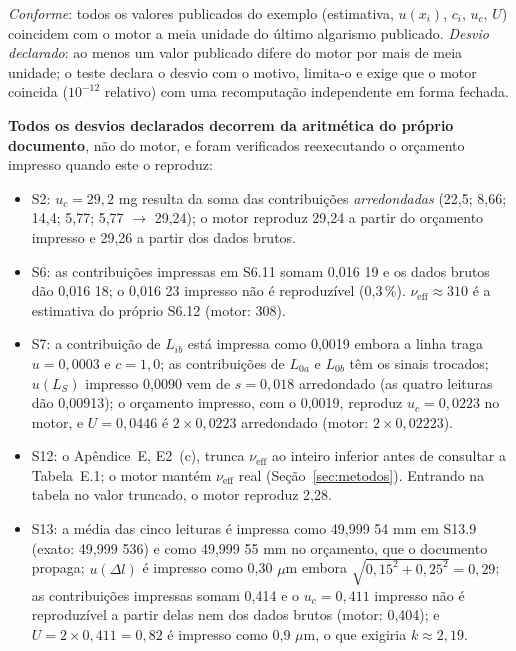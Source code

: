 \documentclass[11pt,a4paper]{article}
\begin{document}
{\small \emph{Conforme}: todos os valores publicados do exemplo (estimativa, \(u(x_i)\), \(c_i\), \(u_c\), \(U\)) coincidem com o motor a meia unidade do último algarismo publicado. \emph{Desvio declarado}: ao menos um valor publicado difere do motor por mais de meia unidade; o teste declara o desvio com o motivo, limita-o e exige que o motor coincida (\(10^{-12}\) relativo) com uma recomputação independente em forma fechada.}

\textbf{Todos os desvios declarados decorrem da aritmética do próprio documento}, não do motor, e foram verificados reexecutando o orçamento impresso quando este o reproduz:
\begin{itemize}
  \item S2: \(u_c = 29{,}2\) mg resulta da soma das contribuições \emph{arredondadas} (22,5; 8,66; 14,4; 5,77; 5,77 \(\rightarrow\) 29,24); o motor reproduz 29,24 a partir do orçamento impresso e 29,26 a partir dos dados brutos.
  \item S6: as contribuições impressas em S6.11 somam 0,016 19 e os dados brutos dão 0,016 18; o 0,016 23 impresso não é reproduzível (0,3\,\%). \(\nu_{\text{eff}} \approx 310\) é a estimativa do próprio S6.12 (motor: 308).
  \item S7: a contribuição de \(L_{ib}\) está impressa como 0,0019 embora a linha traga \(u = 0{,}0003\) e \(c = 1{,}0\); as contribuições de \(L_{0a}\) e \(L_{0b}\) têm os sinais trocados; \(u(L_S)\) impresso 0,0090 vem de \(s = 0{,}018\) arredondado (as quatro leituras dão 0,00913); o orçamento impresso, com o 0,0019, reproduz \(u_c = 0{,}0223\) no motor, e \(U = 0{,}0446\) é \(2 \times 0{,}0223\) arredondado (motor: \(2 \times 0{,}02223\)).
  \item S12: o Apêndice~E, E2~(c), trunca \(\nu_{\text{eff}}\) ao inteiro inferior antes de consultar a Tabela~E.1; o motor mantém \(\nu_{\text{eff}}\) real (Seção~\ref{sec:metodos}). Entrando na tabela no valor truncado, o motor reproduz 2,28.
  \item S13: a média das cinco leituras é impressa como 49,999 54 mm em S13.9 (exato: 49,999 536) e como 49,999 55 mm no orçamento, que o documento propaga; \(u(\Delta l)\) é impresso como 0,30 \(\mu\)m embora \(\sqrt{0{,}15^2 + 0{,}25^2} = 0{,}29\); as contribuições impressas somam 0,414 e o \(u_c = 0{,}411\) impresso não é reproduzível a partir delas nem dos dados brutos (motor: 0,404); e \(U = 2 \times 0{,}411 = 0{,}82\) é impresso como 0,9 \(\mu\)m, o que exigiria \(k \approx 2{,}19\).
\end{itemize}
\end{document}
